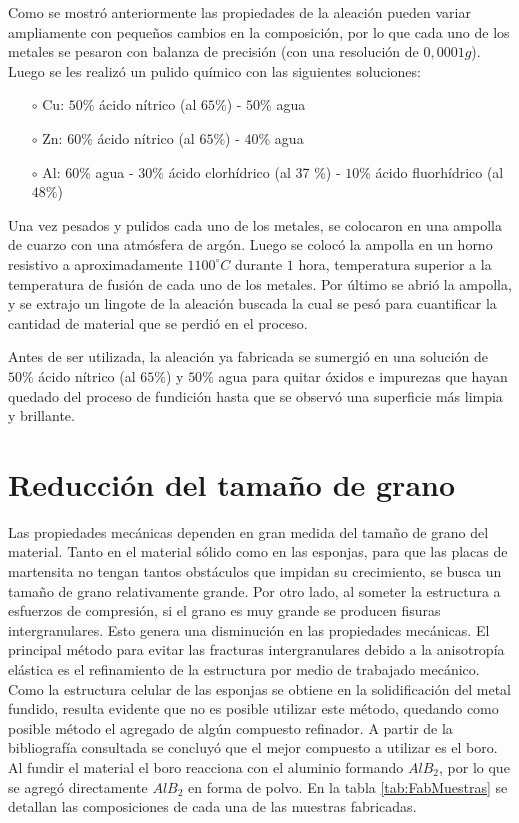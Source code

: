 \documentclass[a4paper,12pt,fleqn,twoside,openany]{book}
\begin{document}
Como se mostró anteriormente las propiedades de la aleación pueden variar ampliamente 
con pequeños cambios en la composición, por lo que cada uno de los metales se pesaron con balanza de precisión (con una resolución de $0,0001g$). 
Luego se les realizó un pulido químico con las siguientes soluciones:
\begin{itemize}
 \item[$\circ$] Cu: $50 \%$ ácido nítrico (al $65 \%$) - $50 \%$ agua
 \item[$\circ$] Zn: $60 \%$ ácido nítrico (al $65 \%$) - $40 \%$ agua
 \item[$\circ$] Al: $60 \%$ agua - $30 \%$ ácido clorhídrico (al 37 \%) - $10 \%$ ácido fluorhídrico (al $48 \%$)
\end{itemize}

Una vez pesados y pulidos cada uno de los metales, se colocaron en una ampolla de cuarzo con una atmósfera de argón. Luego se colocó la ampolla en 
un horno resistivo a aproximadamente $1100^\circ C$ durante $1$ hora, temperatura superior a la temperatura de fusión de cada uno de los metales. Por último se abrió la ampolla, y se extrajo un 
lingote de la aleación buscada la cual se pesó para cuantificar la cantidad de material que se perdió en el proceso.  

Antes de ser utilizada, la aleación ya fabricada se sumergió en una solución de $50 \%$ ácido nítrico (al $65 \%$) y 
$50 \%$ agua para quitar óxidos e impurezas que hayan quedado del proceso de fundición hasta que se observó una superficie más limpia y brillante.

\section{Reducción del tamaño de grano} \label{FabClavos}


Las propiedades mecánicas dependen en gran medida del tamaño de grano del material. Tanto en el material sólido como en las esponjas, para que las placas de martensita no tengan tantos obstáculos que impidan su crecimiento, se busca un tamaño de grano relativamente grande. Por otro 
lado, al someter la estructura a esfuerzos de compresión, si el grano es muy grande se producen fisuras intergranulares. Esto genera 
una disminución en las propiedades mecánicas. El principal método para evitar las fracturas intergranulares debido a la anisotropía elástica es el refinamiento de la estructura por medio de trabajado mecánico. Como la estructura 
celular de las esponjas se obtiene en la solidificación del metal fundido, resulta evidente que no es posible utilizar este método, quedando como posible método el agregado de algún compuesto refinador. A partir de la bibliografía consultada se concluyó que el 
mejor compuesto a utilizar es el boro. Al fundir el material el boro reacciona con el aluminio formando $AlB_2$, por lo que se agregó directamente $AlB_2$ en forma de polvo. En la tabla \ref{tab:FabMuestras} se detallan las composiciones de cada una de las muestras fabricadas. 
\end{document}
